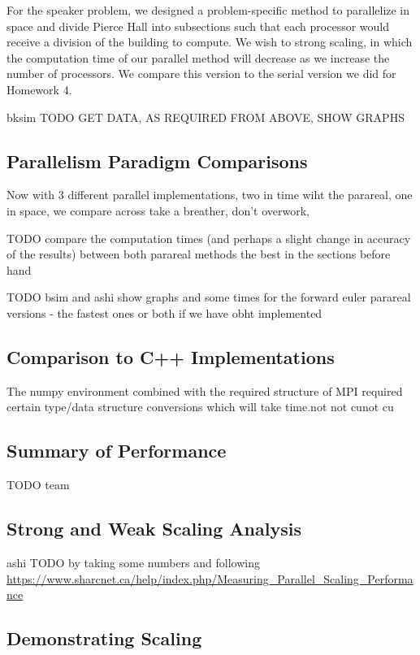 \documentclass[letterpaper,twocolumn,11pt]{article}
\begin{document}
For the speaker problem, we designed a problem-specific method to parallelize in space and divide Pierce Hall into subsections such that each processor would receive a division of the building to compute. We wish to strong scaling, in which the computation time of our parallel method will decrease as we increase the number of processors. We compare this version to the serial version we did for Homework 4.

bksim TODO GET DATA, AS REQUIRED FROM ABOVE, SHOW GRAPHS

\subsection{Parallelism Paradigm Comparisons}

Now with 3 different parallel implementations, two in time wiht the parareal, one in space,  we compare across take a breather, don't overwork, 

TODO compare the computation times (and perhaps a slight change in accuracy of the results) between both parareal methods the best in the sections before hand

TODO bsim and ashi show graphs and some times for the forward euler parareal versions - the fastest ones or both if we have obht implemented

\subsection{Comparison to C++ Implementations}

The numpy environment combined with the required structure of MPI required
certain type/data structure conversions which will take time.not not cunot
cu

\subsection{Summary of Performance}

TODO team

\subsection{Strong and Weak Scaling Analysis}

ashi TODO by taking some numbers and following
\url{https://www.sharcnet.ca/help/index.php/Measuring_Parallel_Scaling_Performance}

\subsection{Demonstrating Scaling}
\end{document}
